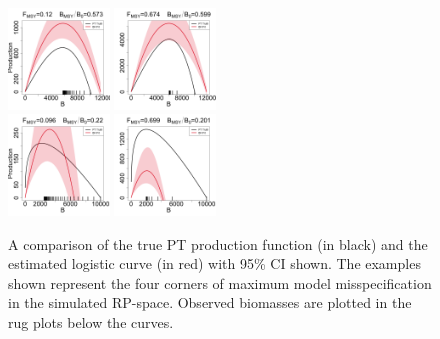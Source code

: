 \begin{figure}
\includegraphics[width=0.24\textwidth]{../ptNew/srrCompareFlatT30X0.12Z0.573.png}
\includegraphics[width=0.24\textwidth]{../ptNew/srrCompareFlatT30X0.674Z0.599.png}\\
\includegraphics[width=0.24\textwidth]{../ptNew/srrCompareFlatT30X0.096Z0.22.png}
\includegraphics[width=0.24\textwidth]{../ptNew/srrCompareFlatT30X0.699Z0.201.png}
\caption{
A comparison of the true PT production function (in black) and the estimated logistic curve (in red)
with 95\% CI shown. The examples shown represent the four corners of maximum model misspecification
in the simulated RP-space. Observed biomasses are plotted in the rug plots below the curves.
}
\label{flatProd}
\end{figure}

